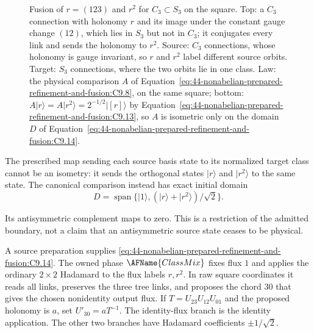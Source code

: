 \begin{figure}[htbp]
\caption{Fusion of $r=(123)$ and $r^2$ for $C_3\subset S_3$ on the square.
Top: a $C_3$ connection with holonomy $r$ and its image under the constant
gauge change $(12)$, which lies in $S_3$ but not in $C_3$; it conjugates
every link and sends the holonomy to $r^2$.  Source: $C_3$ connections, whose
holonomy is gauge invariant, so $r$ and $r^2$ label different source orbits.
Target: $S_3$ connections, where the two orbits lie in one class.  Law: the
physical comparison $A$ of Equation~\eqref{eq:44-nonabelian-prepared-refinement-and-fusion:C9.8},
on the same square; bottom: $A|r\rangle=A|r^2\rangle=2^{-1/2}|[r]\rangle$ by
Equation~\eqref{eq:44-nonabelian-prepared-refinement-and-fusion:C9.13}, so $A$
is isometric only on the domain $D$ of
Equation~\eqref{eq:44-nonabelian-prepared-refinement-and-fusion:C9.14}.}
\label{fig:c3s3-fusion}
\end{figure}

The prescribed map sending each source basis state to its normalized target
class cannot be an isometry: it sends the orthogonal states $|r\rangle$ and
$|r^2\rangle$ to the same state.  The canonical comparison instead has exact
initial domain
\begin{equation}
D=\operatorname{span}\{|1\rangle,(|r\rangle+|r^2\rangle)/\sqrt2\}.
 \label{eq:44-nonabelian-prepared-refinement-and-fusion:C9.14}
\end{equation}

Its antisymmetric complement maps to zero.  This is a restriction of the
admitted boundary, not a claim that an antisymmetric source state ceases to be
physical.

A source preparation supplies
\eqref{eq:44-nonabelian-prepared-refinement-and-fusion:C9.14}.  The owned phase
$\AFName{ClassMix}$ fixes flux $1$ and applies the ordinary $2\times2$ Hadamard
to the flux labels $r,r^2$.  In raw square coordinates it reads all links,
preserves the three tree links, and proposes the chord $30$ that gives the
chosen nonidentity output flux.  If $T=U_{23}U_{12}U_{01}$ and the proposed
holonomy is $a$, set $U'_{30}=aT^{-1}$.  The identity-flux branch is the
identity application.  The other two branches have Hadamard coefficients
$\pm1/\sqrt2$.

